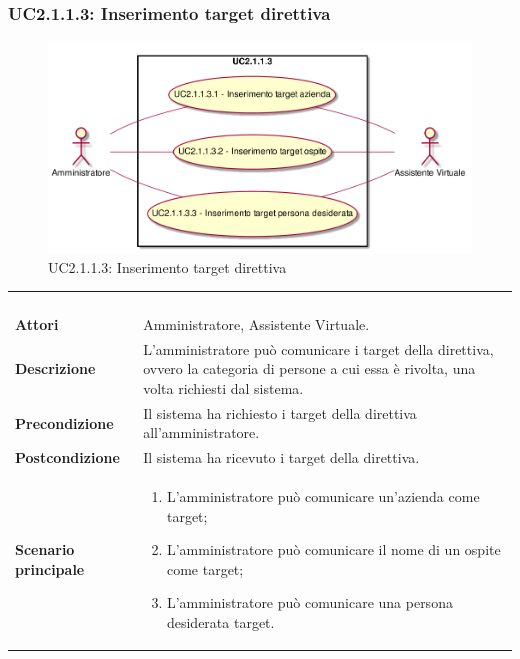 \newpage\subsubsection{UC2.1.1.3: Inserimento target direttiva}
\label{UC2.1.1.3}
\begin{figure}[h]
\centering
\includegraphics[width=\textwidth,height=\textheight,keepaspectratio]{images/UseCaseUC2113.png}
\caption{UC2.1.1.3: Inserimento target direttiva}
\end{figure}
\begin{longtable}{l|p{10cm}}
\rowcolor[gray]{0.8} \multicolumn{2}{c}{} \\
\rowcolor[gray]{0.8} \multicolumn{2}{c}{\textbf{UC2.1.1.3 - Inserimento target direttiva}} \\
\rowcolor[gray]{0.8} \multicolumn{2}{c}{} \\
\hline
&\\
\textbf{Attori} & Amministratore, Assistente Virtuale.\\[7pt]
\textbf{Descrizione} & L'amministratore può comunicare i target della direttiva, ovvero la categoria di persone a cui essa è rivolta, una volta richiesti dal sistema.\\[7pt]
\textbf{Precondizione} & Il sistema ha richiesto i target della direttiva all'amministratore.\\[7pt]
\textbf{Postcondizione} & Il sistema ha ricevuto i target della direttiva.\\[7pt]
\textbf{Scenario principale} &\begin{enumerate}
\item  L'amministratore può comunicare un'azienda come target;
\item  L'amministratore può comunicare il nome di un ospite come target;
\item  L'amministratore può comunicare una persona desiderata target.
\end{enumerate}
\\[7pt]\hline
\end{longtable}

